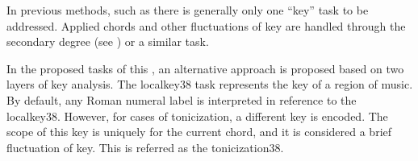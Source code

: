 
In previous methods, such as \textcite{chen2018functional,
chen2019harmony, micchi2020not, micchi2021deep,
mcleod2021modular} there is generally only one ``key'' task
to be addressed. Applied chords and other fluctuations of
key are handled through the secondary degree (see
) or a similar task.

In the proposed tasks of this \thesisdiss{}, an alternative
approach is proposed based on two layers of key analysis.
The \gls{localkey38} task represents the key of a region of
music. By default, any Roman numeral label is interpreted in
reference to the \gls{localkey38}. However, for cases of
tonicization, a different key is encoded. The scope of this
key is uniquely for the current chord, and it is considered
a brief fluctuation of key. This is referred as the
\gls{tonicization38}.
